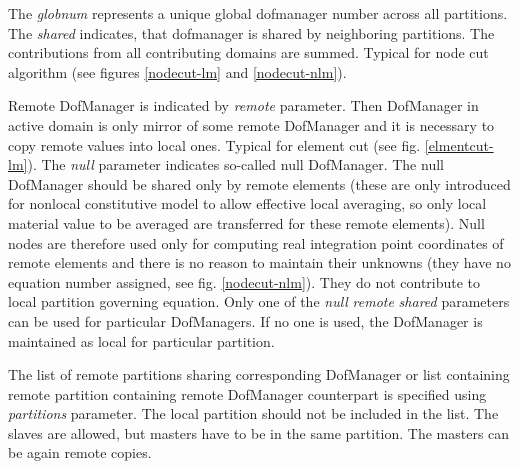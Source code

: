 \documentclass[draft]{article}
\newcommand{\param}[1]{{\em #1}}
\newcommand{\Pmode}[1]{{\sffamily #1}}
\begin{document}
\Pmode{
The \param{globnum} represents a unique global dofmanager number across all partitions.
The \param{shared} indicates, that dofmanager is shared by
neighboring partitions. The contributions from all contributing
domains are summed. Typical for node cut algorithm (see figures \ref{nodecut-lm}
and \ref{nodecut-nlm}).

Remote DofManager is indicated by \param{remote} parameter.
Then DofManager in active domain is only mirror of some remote
DofManager and it is necessary to copy remote values into local
ones. Typical for element cut (see fig. \ref{elmentcut-lm}).
The \param{null} parameter indicates so-called null DofManager. The
null DofManager should be shared only by remote elements (these are
only introduced for nonlocal constitutive model to allow effective
local averaging, so only local material value to be averaged are
transferred for these remote elements). Null nodes are therefore used
only for computing real integration point coordinates of remote
elements and there is no reason to maintain their unknowns (they have
no equation number assigned, see fig. \ref{nodecut-nlm}). They do not
contribute to local partition governing equation.
Only one of the \param{null} \param{remote} \param{shared} parameters can
be used for particular DofManagers. If no one is used, the DofManager
is maintained as local for particular partition.

The list of remote partitions sharing corresponding DofManager or list
containing  remote partition containing remote DofManager counterpart is
specified using \param{partitions} parameter. The local partition
should not be included in the list.
The slaves are allowed, but masters have to be in the same
partition. The masters can be again remote copies.
}
\end{document}
